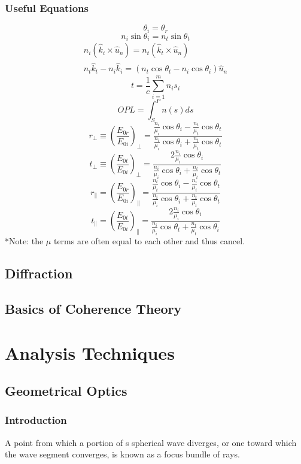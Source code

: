 \documentclass[12pt]{report}
\begin{document}
\section{Useful Equations}
\[\theta_i = \theta_r\]
\[n_i\sin\theta_i = n_t\sin\theta_t\]
\[\begin{array}{c}
n_i(\hat{k}_i \times \hat{u}_n) = n_t (\hat{k}_t \times \hat{u}_n) \\
n_t\hat{k}_t -n_i\hat{k}_i = (n_t\cos\theta_t - n_i\cos\theta_i) \hat{u}_n
\end{array}\]
\[t = \frac{1}{c}\sum_{i=1}^m n_is_i\]
\[OPL = \int_S^P n(s) ds\]
\[r_\perp \equiv \left(\frac{E_{0r}}{E_{0i}}\right)_\perp = \frac{\frac{n_i}{\mu_i}\cos \theta_i-\frac{n_t}{\mu_t}\cos \theta_t}{\frac{n_i}{\mu_i}\cos \theta_i+\frac{n_t}{\mu_t}\cos \theta_t}\]
\[t_\perp \equiv \left(\frac{E_{0t}}{E_{0i}}\right)_\perp = \frac{2 \frac{n_i}{\mu_i}\cos \theta_i}{\frac{n_i}{\mu_i}\cos \theta_i+\frac{n_t}{\mu_t}\cos \theta_t}\]
\[r_\parallel = \left(\frac{E_{0r}}{E_{0i}}\right)_\parallel = \frac{\frac{n_t}{\mu_t}\cos \theta_i-\frac{n_i}{\mu_i}\cos \theta_t}{\frac{n_i}{\mu_i}\cos \theta_i+\frac{n_t}{\mu_t}\cos \theta_t}\]
\[t_\parallel = \left(\frac{E_{0t}}{E_{0i}}\right)_\parallel = \frac{2 \frac{n_i}{\mu_i}\cos \theta_i}{\frac{n_i}{\mu_i}\cos \theta_t+\frac{n_t}{\mu_t}\cos \theta_i}\]
*Note: the $\mu$ terms are often equal to each other and thus cancel. 

\chapter{Diffraction}
\chapter{Basics of Coherence Theory}

\part{Analysis Techniques}
\chapter{Geometrical Optics}

\section{Introduction}
A point from which a portion of s spherical wave diverges, or one toward which the wave segment converges, is known as a focus bundle of rays. 
\end{document}
